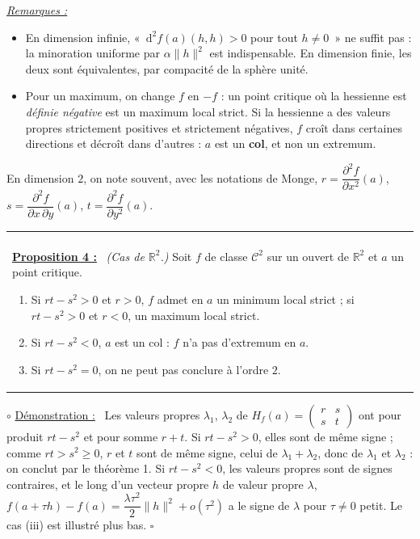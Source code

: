 \documentclass[a4paper,twoside]{report}
\makeatletter
\newcommand{\mot}[1]{\textcolor{rougecours}{\textbf{#1}}}
\newenvironment{cadre}%
 {\par\vspace{2mm}\noindent\begin{tabular}{|@{\hspace{4mm}}p{0.93\textwidth}@{\hspace{4mm}}|}
  \hline \\[-2mm]}%
 {\\[2mm] \hline \end{tabular}\par\vspace{3mm}}
\newcommand{\propo}[1]{\textbf{\underline{Proposition #1 :}}~}
\newenvironment{demo}%
 {\par\needspace{4\baselineskip}\vspace{1mm}\noindent$\circ$ \underline{Démonstration :}~\setlength{\parskip}{3pt plus 1pt}}%
 {\hfill$\square$\par\vspace{2mm}}
\newenvironment{remarques}%
 {\par\needspace{6\baselineskip}\vspace{1mm}\begin{list}{}{\leftmargin=1cm \rightmargin=0.5cm}\item[]%
  \textit{\underline{Remarques :}}%
  \begin{itemize}[label=$\bullet$,leftmargin=0.45cm,topsep=3pt,itemsep=4pt]}%
 {\end{itemize}\end{list}\vspace{1mm}}
\newcommand{\R}{\mathbb{R}}
\newcommand{\dd}{\mathrm{d}}                      %
\newcommand{\norme}[1]{\lVert #1 \rVert}         %
\newcommand{\Cc}{\mathcal{C}}                     %
\newcommand{\Hs}{H}                               %
\makeatother
\begin{document}
\begin{remarques}
  \item En dimension infinie, «~$\dd^{2} f(a)(h, h) > 0$ pour tout $h \neq 0$~» ne suffit pas : la minoration uniforme par $\alpha\norme{h}^{2}$ est indispensable. En dimension finie, les deux sont équivalentes, par compacité de la sphère unité.
  \item Pour un maximum, on change $f$ en $-f$ : un point critique où la hessienne est \emph{définie négative} est un maximum local strict. Si la hessienne a des valeurs propres strictement positives et strictement négatives, $f$ croît dans certaines directions et décroît dans d'autres : $a$ est un \mot{col}, et non un extremum.
\end{remarques}

\noindent En dimension $2$, on note souvent, avec les notations de Monge, $r = \dfrac{\partial^{2} f}{\partial x^{2}}(a)$, $s = \dfrac{\partial^{2} f}{\partial x\,\partial y}(a)$, $t = \dfrac{\partial^{2} f}{\partial y^{2}}(a)$.

\begin{cadre}
\propo{4} \emph{(Cas de $\R^{2}$.)} Soit $f$ de classe $\Cc^{2}$ sur un ouvert de $\R^{2}$ et $a$ un point critique.
\begin{enumerate}[label=(\roman*),topsep=3pt,itemsep=2pt]
  \item Si $rt - s^{2} > 0$ et $r > 0$, $f$ admet en $a$ un minimum local strict ; si $rt - s^{2} > 0$ et $r < 0$, un maximum local strict.
  \item Si $rt - s^{2} < 0$, $a$ est un col : $f$ n'a pas d'extremum en $a$.
  \item Si $rt - s^{2} = 0$, on ne peut pas conclure à l'ordre $2$.
\end{enumerate}
\end{cadre}

\begin{demo}
Les valeurs propres $\lambda_{1}$, $\lambda_{2}$ de $\Hs_{f}(a) = \begin{pmatrix} r & s \\ s & t \end{pmatrix}$ ont pour produit $rt - s^{2}$ et pour somme $r + t$. Si $rt - s^{2} > 0$, elles sont de même signe ; comme $rt > s^{2} \geqslant 0$, $r$ et $t$ sont de même signe, celui de $\lambda_{1} + \lambda_{2}$, donc de $\lambda_{1}$ et $\lambda_{2}$ : on conclut par le théorème 1. Si $rt - s^{2} < 0$, les valeurs propres sont de signes contraires, et le long d'un vecteur propre $h$ de valeur propre $\lambda$, $f(a + \tau h) - f(a) = \dfrac{\lambda\tau^{2}}{2}\norme{h}^{2} + o(\tau^{2})$ a le signe de $\lambda$ pour $\tau \neq 0$ petit. Le cas (iii) est illustré plus bas.
\end{demo}
\end{document}
